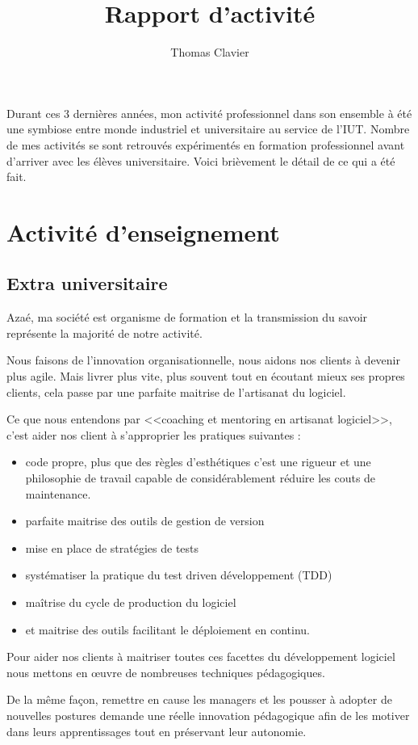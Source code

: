 \documentclass[a4paper]{article}
\title{Rapport d’activité}
\author{Thomas Clavier}
\begin{document}
\maketitle

Durant ces 3 dernières années, mon activité professionnel dans son ensemble à été une symbiose entre monde industriel et universitaire au service de l'IUT. 
Nombre de mes activités se sont retrouvés expérimentés en formation professionnel avant d'arriver avec les élèves universitaire.
Voici brièvement le détail de ce qui a été fait.

\section{Activité d'enseignement}
\subsection{Extra universitaire}
Azaé, ma société est organisme de formation et la transmission du savoir représente la majorité de notre activité.

Nous faisons de l'innovation organisationnelle, nous aidons nos clients à devenir plus agile. Mais livrer plus vite, plus souvent tout en écoutant mieux ses propres clients, cela passe par une parfaite maitrise de l'artisanat du logiciel.

Ce que nous entendons par <<coaching et mentoring en artisanat logiciel>>, c'est aider nos client à s'approprier les pratiques suivantes : 
\begin{itemize}
  \item code propre, plus que des règles d'esthétiques c'est une rigueur et une philosophie de travail capable de considérablement réduire les couts de maintenance.
  \item parfaite maitrise des outils de gestion de version
  \item mise en place de stratégies de tests 
  \item systématiser la pratique du test driven développement (TDD)
  \item maîtrise du cycle de production du logiciel
  \item et maitrise des outils facilitant le déploiement en continu.
\end{itemize}

Pour aider nos clients à maitriser toutes ces facettes du développement logiciel nous mettons en œuvre de nombreuses techniques pédagogiques.

De la même façon, remettre en cause les managers et les pousser à adopter de nouvelles postures demande une réelle innovation pédagogique afin de les motiver dans leurs apprentissages tout en préservant leur autonomie. 
\end{document}
